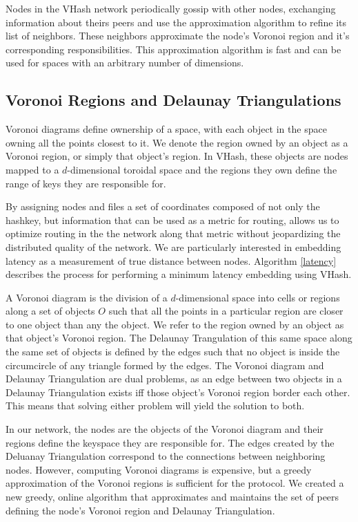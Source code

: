 \documentclass{IEEEtran}
\begin{document}
Nodes in the VHash network periodically gossip with other nodes, exchanging information about theirs peers and use the approximation algorithm to refine its list of neighbors.  These neighbors approximate the node's Voronoi region and it's corresponding responsibilities.  This approximation algorithm is fast and can be used for spaces with an arbitrary number of dimensions.


\subsection{Voronoi Regions and Delaunay Triangulations}
Voronoi diagrams define ownership of a space, with each object in the space owning all the points closest to it.  We denote the region owned by an object as a Voronoi region, or simply that object's region.  In VHash, these objects are nodes mapped to a $d$-dimensional toroidal space and the regions they own define the range of keys they are responsible for.

By assigning nodes and files a set of coordinates composed of not only the hashkey, but information that can be used as a metric for routing,  allows us to optimize routing in the the network along that metric without jeopardizing the distributed quality of the network.  We are particularly interested in embedding latency as a measurement of true distance between nodes.  Algorithm \ref{latency} describes the process for performing a minimum latency embedding using VHash.


A Voronoi diagram is the division of a $d$-dimensional space into cells or regions along a set of objects $O$ such that all the points in a particular region are closer to one object than any the object.  
We refer to the region owned by an object as that object's Voronoi region.
The Delaunay Trangulation of this same space along the same set of objects is defined by the edges such that no object is inside the circumcircle of any triangle formed by the edges\cite{geoalg}.  
The Voronoi diagram and Delaunay Triangulation are dual problems, as an edge between two objects in a Delaunay Triangulation exists iff those object's Voronoi region border each other.  
This means that solving either problem will yield the solution to both. 

In our network, the nodes are the objects of the Voronoi diagram and their regions define the keyspace they are responsible for.  The edges created by the Deluanay Triangulation correspond to the connections between neighboring nodes.  However, computing Voronoi diagrams is expensive, but a greedy approximation of the Voronoi regions is sufficient for the protocol.  We created a new greedy, online algorithm that approximates and maintains the set of peers defining the node's Voronoi region and Delaunay Triangulation.
\end{document}
